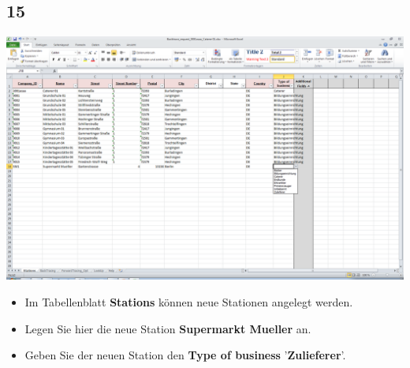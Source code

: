 \documentclass{beamer}
\begin{document}
\subsection{15}
\begin{frame}
	\begin{center}
  		\includegraphics[height=0.6\textheight]{15.png}
	\end{center}
	\begin{itemize}
		\item Im Tabellenblatt \textbf{Stations} können neue Stationen angelegt werden.
		\item Legen Sie hier die neue Station \textbf{Supermarkt Mueller} an.
		\item Geben Sie der neuen Station den \textbf{Type of business} '\textbf{Zulieferer}'.
	\end{itemize}
\end{frame}
\end{document}

